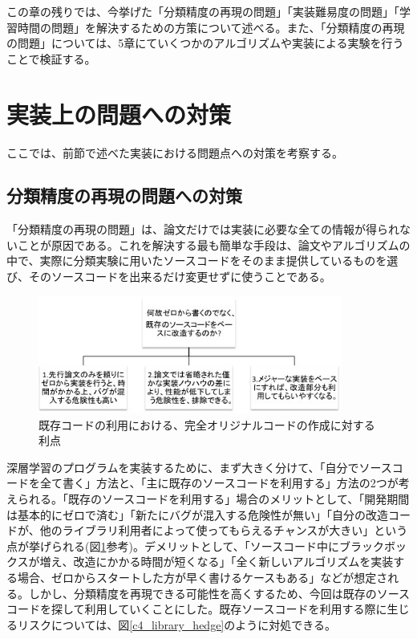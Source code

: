 この章の残りでは、今挙げた「分類精度の再現の問題」「実装難易度の問題」「学習時間の問題」を解決するための方策について述べる。また、「分類精度の再現の問題」については、5章にていくつかのアルゴリズムや実装による実験を行うことで検証する。

\section{実装上の問題への対策}
ここでは、前節で述べた実装における問題点への対策を考察する。
\subsection{分類精度の再現の問題への対策}
「分類精度の再現の問題」は、論文だけでは実装に必要な全ての情報が得られないことが原因である。これを解決する最も簡単な手段は、論文やアルゴリズムの中で、実際に分類実験に用いたソースコードをそのまま提供しているものを選び、そのソースコードを出来るだけ変更せずに使うことである。
\begin{figure}[tbp]
 \begin{center}
  \includegraphics[width=100mm]{img/c4/library_merit}
 \end{center}
 \caption{既存コードの利用における、完全オリジナルコードの作成に対する利点}
 \label{c4_library_merit}
\end{figure}
深層学習のプログラムを実装するために、まず大きく分けて、「自分でソースコードを全て書く」方法と、「主に既存のソースコードを利用する」方法の2つが考えられる。「既存のソースコードを利用する」場合のメリットとして、「開発期間は基本的にゼロで済む」「新たにバグが混入する危険性が無い」「自分の改造コードが、他のライブラリ利用者によって使ってもらえるチャンスが大きい」という点が挙げられる(図\ref{c4_library_merit}参考)。デメリットとして、「ソースコード中にブラックボックスが増え、改造にかかる時間が短くなる」「全く新しいアルゴリズムを実装する場合、ゼロからスタートした方が早く書けるケースもある」などが想定される。しかし、分類精度を再現できる可能性を高くするため、今回は既存のソースコードを探して利用していくことにした。既存ソースコードを利用する際に生じるリスクについては、図\ref{c4_library_hedge}のように対処できる。\par
